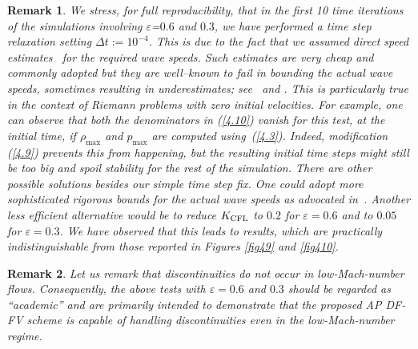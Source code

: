 \documentclass[A4paper,12pt,twoside]{article}
\newtheorem{remark}{Remark}[section]
\numberwithin{equation}{section}
\numberwithin{figure}{section}
\numberwithin{table}{section}
\newcommand{\dt}{\Delta t}
\newcommand{\ve}{\varepsilon}
\newcommand\eref[1]{(\ref{#1})}
\newcommand{\lore}[1]{{\leavevmode\color{red} #1}}
\begin{document}
\begin{remark}
	\lore{We stress, for full reproducibility, that in the first 10 time iterations of the simulations involving $\ve$=$0.6$ and $0.3$, we have performed a time step relaxation setting $\dt:=10^{-4}$.
	This is due to the fact that we assumed direct speed estimates~\cite{toro2020bounds} for the required wave speeds.
	Such estimates are very cheap and commonly adopted but they are well--known to fail in bounding the actual wave speeds, sometimes resulting in underestimates; see~\cite{toro2020bounds,toro2026rusanov,micalizzi2025force} and \cite[Remark 6]{micalizzitoro2024}.
	This is particularly true in the context of Riemann problems with zero initial velocities.
	For example, one can observe that both the denominators in \eref{4.10} vanish for this test, at the initial time, if $\rho_{\max}$ and $p_{\max}$ are computed using~\eref{4.3}.
	Indeed, modification \eref{4.9} prevents this from happening, but the resulting initial time steps might still be too big and spoil stability for the rest of the simulation.
	There are other possible solutions besides our simple time step fix.
	One could adopt more sophisticated rigorous bounds for the actual wave speeds as advocated in~\cite{toro2020bounds,toro2026rusanov}.
	Another less efficient alternative would be to reduce $K_{\rm CFL}$ to
	$0.2$ for $\ve=0.6$ and to $0.05$ for $\ve=0.3$. We have observed that this leads to results, which are practically indistinguishable from those
	reported in Figures \ref{fig49} and \ref{fig410}.	
}
	
%
\end{remark}
\begin{remark}
Let us remark that discontinuities 
\lore{do not} occur in low-Mach-number flows. Consequently, the above tests with $\ve=0.6$ and $0.3$
should be regarded as %
``academic'' and are 
\lore{primarily}
intended to demonstrate that the proposed AP DF-FV scheme is capable of handling
discontinuities even in the low-Mach-number regime.
\end{remark}
\end{document}
